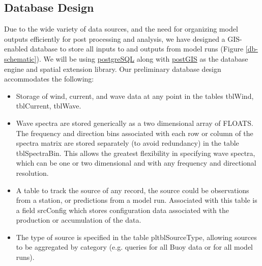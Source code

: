 \documentclass[11pt,letterpaper,oneside,reqno]{article}
\begin{document}
\subsection{Database Design}

Due to the wide variety of data sources, and the need for
organizing model outputs efficiently for post processing and
analysis, we have designed a GIS-enabled database to store all
inputs to and outputs from model runs (Figure \ref{db-schematic}). We will be using
\href{http://www.postgresql.org/}{postgreSQL} along with
\href{http://postgis.refractions.net/}{postGIS} as the database
engine and spatial extension library. Our preliminary database
design accommodates the following:

\begin{itemize}
\item
  Storage of wind, current, and wave data at any point in the tables
  tblWind, tblCurrent, tblWave.
\item
  Wave spectra are stored generically as a two dimensional array of
  FLOATS. The frequency and direction bins associated with each row
  or column of the spectra matrix are stored separately (to avoid
  redundancy) in the table tblSpectraBin. This allows the greatest
  flexibility in specifying wave spectra, which can be one or two
  dimensional and with any frequency and directional resolution.
\item
  A table to track the source of any record, the source could be
  observations from a station, or predictions from a model run.
  Associated with this table is a field srcConfig which stores
  configuration data associated with the production or accumulation
  of the data.
\item
  The type of source is specified in the table pltblSourceType,
  allowing sources to be aggregated by category (e.g. queries for all
  Buoy data or for all model runs).
\end{itemize}
\end{document}
